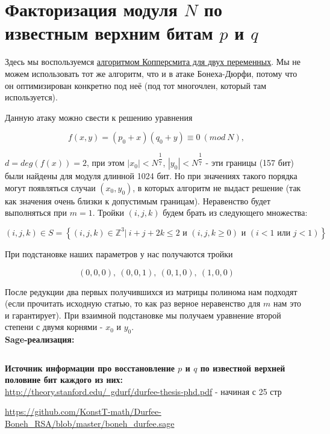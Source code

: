 \documentclass[12pt,a4paper]{scrartcl}
\begin{document}
\section{Факторизация модуля $N$ по известным верхним битам $p$ и $q$}

Здесь мы воспользуемся \href{https://yatb.kksctf.ru/}{алгоритмом Копперсмита для двух переменных}. Мы не можем использовать тот же алгоритм, что и в атаке Бонеха-Дюрфи, потому что он оптимизирован конкретно под неё (под тот многочлен, который там используется).

Данную атаку можно свести к решению уравнения 

$$f(x,y)=(p_0+x)(q_0+y)\equiv 0\ (mod\ N),$$

$d=deg(f(x))=2$, при этом $|x_0|<N^{\dfrac{1}{7}}$, $|y_0|<N^{\dfrac{1}{7}}$ - эти границы (157 бит) были найдены для модуля длинной 1024 бит. Но при значениях такого порядка могут появляться случаи $(x_0,y_0)$, в которых алгоритм не выдаст решение (так как значения очень близки к допустимым границам). Неравенство будет выполняться при $m=1$. Тройки $(i,j,k)$ будем брать из следующего множества:

$$(i,j,k) \in S = \left\{ (i,j,k) \in \mathbb{Z}^3 |\ i+j+2k \leq 2\text{ и }(i,j,k \geq 0)\text{ и }(i<1\text{ или }j<1)\right\}$$

При подстановке наших параметров у нас получаются тройки 

$$(0,0,0),\ (0,0,1),\ (0,1,0),\ (1,0,0)$$

После редукции два первых получившихся из матрицы полинома нам подходят (если прочитать исходную статью, то как раз верное неравенство для $m$ нам это и гарантирует). При взаимной подстановке мы получаем уравнение второй степени с двумя корнями - $x_0$ и $y_0$.\\

\textbf{Sage-реализация:}

\inputminted[tabsize=4,obeytabs,fontsize=\footnotesize]{python3}{./RSA_scripts/upper_bit_p_and_q.sage}

\textbf{Источник информации про восстановление  $p$ и $q$ по известной верхней половине бит каждого из них:}\\

\href{http://theory.stanford.edu/~gdurf/durfee-thesis-phd.pdf}{http://theory.stanford.edu/~gdurf/durfee-thesis-phd.pdf} - начиная с 25 стр

\href{https://github.com/KonstT-math/Durfee-Boneh_RSA/blob/master/boneh_durfee.sage}{https://github.com/KonstT-math/Durfee-Boneh\_RSA/blob/master/boneh\_durfee.sage}
\end{document}
